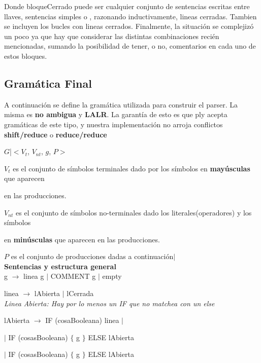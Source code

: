 Donde bloqueCerrado puede ser cualquier conjunto de sentencias escritas entre llaves, sentencias simples o , razonando inductivamente, lineas cerradas. Tambien se incluyen los bucles con lineas cerrados. Finalmente, la situación se complejizó un poco ya que hay que considerar las distintas combinaciones recién mencionadas, sumando la posibilidad de tener, o no, comentarios en cada uno de estos bloques.


\subsection{Gramática Final}
A continuación se define la gramática utilizada para construir el parser. La misma es \textbf{no ambigua} y \textbf{LALR}. La garantía de esto es que ply acepta gramáticas de este tipo, y nuestra implementación no arroja conflictos \textbf{shift/reduce} o \textbf{reduce/reduce} \\

\linespread{1.125}\selectfont

$G$|$<V_{t}$, $V_{nt}$, $g$, $P>$

$V_{t}$ es el conjunto de símbolos terminales dado por los símbolos en \textbf{mayúsculas} que aparecen 

en las producciones.


$V_{nt}$ es el conjunto de símbolos no-terminales dado los literales(operadores) y los símbolos

en \textbf{minúsculas} que aparecen en las producciones.



$P$ es el conjunto de producciones dadas a continuación$|$\\


\textbf{Sentencias y estructura general} \\

g $\rightarrow$ linea g $|$ COMMENT g $|$ empty 

linea $\rightarrow$ lAbierta $|$ lCerrada \\


\textit{Linea Abierta: Hay por lo menos un IF que no matchea con un else} 

lAbierta $\rightarrow$ IF (cosaBooleana) linea $|$

\hspace{15mm}$|$ IF (cosasBooleana) $\{$ g $\}$ ELSE lAbierta

\hspace{15mm}$|$ IF (cosasBooleana) $\{$ g $\}$ ELSE lAbierta

